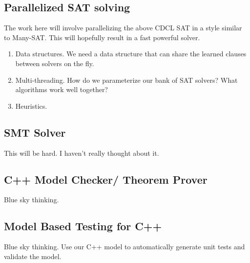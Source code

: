 \subsection{Parallelized SAT solving}
The work here will involve parallelizing the above CDCL SAT in a style similar to Many-SAT. This will hopefully result in a fast powerful solver.
\begin{enumerate}
\item Data structures. We need a data structure that can share the learned clauses between solvers on the fly.
\item Multi-threading. How do we parameterize our bank of SAT solvers? What algorithms work well together? 
\item Heuristics.
\end{enumerate}

\subsection{SMT Solver}
This will be hard. I haven't really thought about it.

\subsection{C++ Model Checker/ Theorem Prover}
Blue sky thinking.

\subsection{Model Based Testing for C++}
Blue sky thinking. Use our C++ model to automatically generate unit tests and validate the model.



